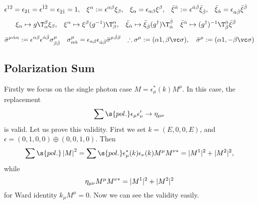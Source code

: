 \begin{conclusion}{}
\begin{align*}
  \epsilon^{12}=\epsilon_{21}=\epsilon^{\dot1\dot2}=\epsilon_{\dot2\dot1}&=1,&
\xi^\alpha&:=\epsilon^{\alpha\beta}\xi_\beta,& \xi_\alpha&=\epsilon_{\alpha\beta}\xi^\beta,&
\bar\xi^{\dot\alpha}&:=\epsilon^{{\dot\alpha}{\dot\beta}}\bar\xi_{\dot\beta},& \bar\xi_{\dot\alpha}&=\epsilon_{{\dot\alpha}{\dot\beta}}\bar\xi^{\dot\beta}
\end{align*}\vspace{-2.8zw}
\begin{align*}
  \xi_\alpha      &\mapsto g\T_\alpha^\beta\xi_\beta,
& \xi^\alpha      &\mapsto \xi^\beta (g^{-1})\T_\beta^\alpha,
& \bar\xi_\dalpha &\mapsto \bar\xi_\dbeta(g^\dagger)\T^\dbeta_\dalpha
& \bar\xi^\dalpha &\mapsto (g^\dagger)^{-1}\T^\dalpha_\dbeta\bar\xi^\dbeta
\end{align*}\vspace{-2.8zw}
\begin{align*}
  \bSm{}^{\dalpha\alpha} &:= \epsilon^{\alpha\beta}\epsilon^{\dalpha\dbeta}\Sm_{\beta\dbeta}&
 \Sm_{\alpha\dalpha}&= \epsilon_{\alpha\beta}\epsilon_{\dalpha\dbeta}\bSm{}^{\dbeta\beta}&
 \therefore \Sm:=(\alpha1,\beta\vc\sigma),\quad\bSm:=(\alpha1,-\beta\vc\sigma)
\end{align*}
\end{conclusion}


\subsection{Polarization Sum}\label{Sec:Verbose:PolarizationSum}
Firstly we focus on the single photon case $M=\epsilon_\mu^*(k)M^{\mu}$.
In this case, the replacement
\begin{equation}
 \sum\s{pol.}\epsilon_\mu\epsilon'_\nu \to \Hmnd
\end{equation}
is valid. Let us prove this validity. First we set $k=(E,0,0,E)$, and $\epsilon=(0,1,0,0)\oplus(0,0,1,0)$. Then
\begin{equation}
  \sum\s{pol.}\left|M\right|^2
= \sum\s{pol.}\epsilon_\mu^*(k)\epsilon_\nu(k)M^{\mu}M^{\nu*}
= |M^1|^2+|M^2|^2,
\end{equation}
while
\begin{equation}
 \eta_{\mu\nu} M^{\mu}M^{\nu*} = |M^1|^2+|M^2|^2
\end{equation}
for Ward identity $k_\mu M^\mu=0$. Now we can see the validity easily.

